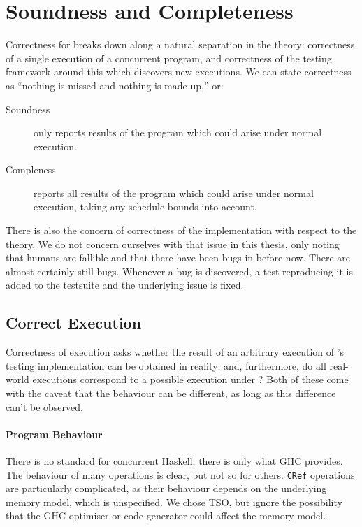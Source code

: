 \section{Soundness and Completeness}
\label{sec:dejafu-correctness}

Correctness for \dejafu{} breaks down along a natural separation in
the theory: correctness of a single execution of a concurrent program,
and correctness of the testing framework around this which discovers
new executions.  We can state correctness as ``nothing is missed and
nothing is made up,'' or:

\begin{description}
\item[Soundness] \dejafu{} only reports results of the program which
  could arise under normal execution.
\item[Compleness] \dejafu{} reports all results of the program which
  could arise under normal execution, taking any schedule bounds into
  account.
\end{description}

There is also the concern of correctness of the implementation with
respect to the theory.  We do not concern ourselves with that issue in
this thesis, only noting that humans are fallible and that there have
been bugs in \dejafu{} before now.  There are almost certainly still
bugs.  Whenever a bug is discovered, a test reproducing it is added to
the testsuite and the underlying issue is fixed.

\subsection{Correct Execution}

Correctness of execution asks whether the result of an arbitrary
execution of \dejafu{}'s testing implementation can be obtained in
reality; and, furthermore, do all real-world executions correspond to
a possible execution under \dejafu{}?  Both of these come with the
caveat that the behaviour can be different, as long as this difference
can't be observed.

\paragraph{Program Behaviour}
There is no standard for concurrent Haskell, there is only what GHC
provides.  The behaviour of many operations is clear, but not so for
others.  \verb|CRef| operations are particularly complicated, as their
behaviour depends on the underlying memory model, which is
unspecified.  We chose TSO, but ignore the possibility that the GHC
optimiser or code generator could affect the memory model.

